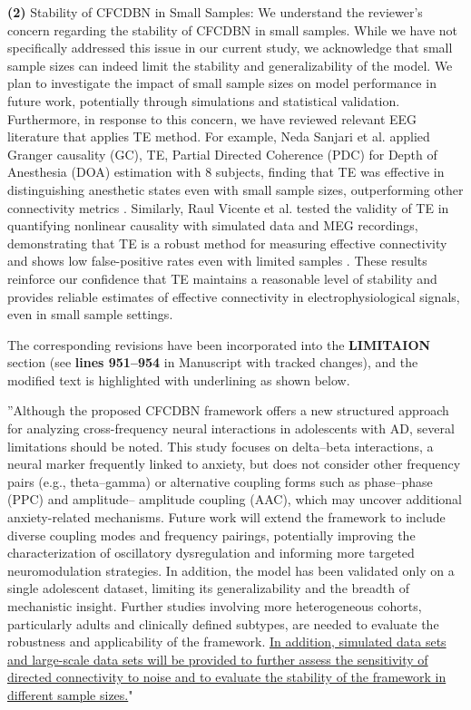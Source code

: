 \documentclass[12pt,technote,onecolumn]{IEEEtran}
\begin{document}
\textbf{(2)} Stability of CFCDBN in Small Samples:
We understand the reviewer’s concern regarding the stability of CFCDBN in small samples. While we have not specifically addressed this issue in our current study, we acknowledge that small sample sizes can indeed limit the stability and generalizability of the model. We plan to investigate the impact of small sample sizes on model performance in future work, potentially through simulations and statistical validation. Furthermore, in response to this concern, we have reviewed relevant EEG literature that applies TE method. For example, Neda Sanjari et al. applied Granger causality (GC), TE, Partial Directed Coherence (PDC) for Depth of Anesthesia (DOA) estimation with 8 subjects, finding that TE was effective in distinguishing anesthetic states even with small sample sizes, outperforming other connectivity metrics \cite{sanjari2021assessment}. Similarly, Raul Vicente et al. tested the validity of TE in quantifying nonlinear causality with simulated data and MEG recordings, demonstrating that TE is a robust method for measuring effective connectivity and shows low false-positive rates even with limited samples \cite{vicente2011transfer}. These results reinforce our confidence that TE maintains a reasonable level of stability and provides reliable estimates of effective connectivity in electrophysiological signals, even in small sample settings.


The corresponding revisions have been incorporated into the \textbf{LIMITAION} section (see \textbf{lines 951–954} in Manuscript with tracked changes), and the modified text is highlighted with underlining as shown below.

”Although the proposed CFCDBN framework offers a new
structured approach for analyzing cross-frequency neural interactions
in adolescents with AD, several limitations should
be noted. This study focuses on delta–beta interactions, a
neural marker frequently linked to anxiety, but does not
consider other frequency pairs (e.g., theta–gamma) or alternative
coupling forms such as phase–phase (PPC) and amplitude–
amplitude coupling (AAC), which may uncover additional
anxiety-related mechanisms. Future work will extend the
framework to include diverse coupling modes and frequency
pairings, potentially improving the characterization of oscillatory
dysregulation and informing more targeted neuromodulation
strategies. In addition, the model has been validated only
on a single adolescent dataset, limiting its generalizability and
the breadth of mechanistic insight. Further studies involving more heterogeneous cohorts, particularly adults and clinically defined subtypes, are needed to evaluate the robustness and applicability of the framework. \uline{In addition, simulated data sets and large-scale data sets will be provided to further assess the sensitivity of directed connectivity to noise and to evaluate the stability of the framework in different sample sizes.}"
\end{document}
